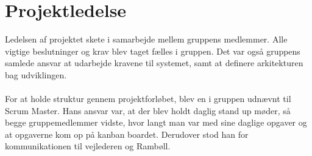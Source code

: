 \section{Projektledelse}
Ledelsen af projektet skete i samarbejde mellem gruppens medlemmer. Alle vigtige beslutninger og krav blev taget fælles i gruppen.
Det var også gruppens samlede ansvar at udarbejde kravene til systemet, samt at definere arkitekturen bag udviklingen. \\ \\
For at holde struktur gennem projektforløbet, blev en i gruppen udnævnt til Scrum Master. Hans ansvar var, at der blev holdt daglig stand up møder, så begge gruppemedlemmer vidste, hvor langt man var med sine daglige opgaver og at opgaverne kom op på kanban boardet. Derudover stod han for kommunikationen til vejlederen og Rambøll. \\
